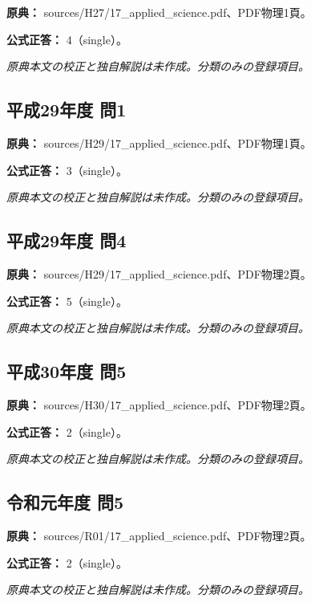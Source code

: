 \noindent\textbf{原典：} sources/H27/17\_applied\_science.pdf、PDF物理1頁。

\textbf{公式正答：} 4（single）。

\par\textit{原典本文の校正と独自解説は未作成。分類のみの登録項目。}

\subsection{平成29年度 問1}
\label{q:h29-reg-applied-01}

\noindent\textbf{原典：} sources/H29/17\_applied\_science.pdf、PDF物理1頁。

\textbf{公式正答：} 3（single）。

\par\textit{原典本文の校正と独自解説は未作成。分類のみの登録項目。}

\subsection{平成29年度 問4}
\label{q:h29-reg-applied-04}

\noindent\textbf{原典：} sources/H29/17\_applied\_science.pdf、PDF物理2頁。

\textbf{公式正答：} 5（single）。

\par\textit{原典本文の校正と独自解説は未作成。分類のみの登録項目。}

\subsection{平成30年度 問5}
\label{q:h30-reg-applied-05}

\noindent\textbf{原典：} sources/H30/17\_applied\_science.pdf、PDF物理2頁。

\textbf{公式正答：} 2（single）。

\par\textit{原典本文の校正と独自解説は未作成。分類のみの登録項目。}

\subsection{令和元年度 問5}
\label{q:r01-reg-applied-05}

\noindent\textbf{原典：} sources/R01/17\_applied\_science.pdf、PDF物理2頁。

\textbf{公式正答：} 2（single）。

\par\textit{原典本文の校正と独自解説は未作成。分類のみの登録項目。}

